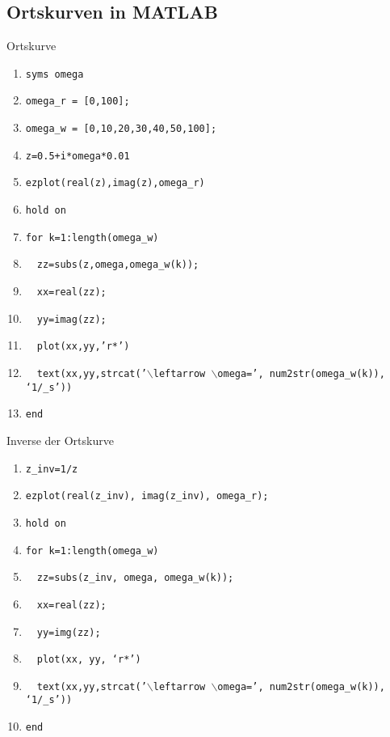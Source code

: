 \subsection{Ortskurven in MATLAB}
Ortskurve
\begin{enumerate}[$\texttt{>}\texttt{>}$]
\item {\color{red}\texttt{syms omega}}
\item {\color{red}\texttt{omega\_r = [0,100];}}
\item {\color{red}\texttt{omega\_w = [0,10,20,30,40,50,100];}}
\item {\color{red}\texttt{z=0.5+i*omega*0.01}}
\item {\color{red}\texttt{ezplot(real(z),imag(z),omega\_r)}}
\item {\color{red}\texttt{hold on}}
\item {\color{red}\texttt{for k=1:length(omega\_w)}}
\item $\quad${\color{red}\texttt{zz=subs(z,omega,omega\_w(k));}}
\item $\quad${\color{red}\texttt{xx=real(zz);}}
\item $\quad${\color{red}\texttt{yy=imag(zz);}}
\item $\quad${\color{red}\texttt{plot(xx,yy,'r*')}}
\item $\quad${\color{red}\texttt{text(xx,yy,strcat('$\backslash$leftarrow $\backslash$omega=', num2str(omega\_w(k)), `1/\_s'))}}
\item {\color{red}\texttt{end}}
\end{enumerate}
Inverse der Ortskurve
\begin{enumerate}[$\texttt{>}\texttt{>}$]
\item {\color{red}\texttt{z\_inv=1/z}}
\item {\color{red}\texttt{ezplot(real(z\_inv), imag(z\_inv), omega\_r);}}
\item {\color{red}\texttt{hold on}}
\item {\color{red}\texttt{for k=1:length(omega\_w)}}
\item $\quad${\color{red}\texttt{zz=subs(z\_inv, omega, omega\_w(k));}}
\item $\quad${\color{red}\texttt{xx=real(zz);}}
\item $\quad${\color{red}\texttt{yy=img(zz);}}
\item $\quad${\color{red}\texttt{plot(xx, yy, `r*')}}
\item $\quad${\color{red}\texttt{text(xx,yy,strcat('$\backslash$leftarrow $\backslash$omega=', num2str(omega\_w(k)), `1/\_s'))}}
\item {\color{red}\texttt{end}}
\end{enumerate}













